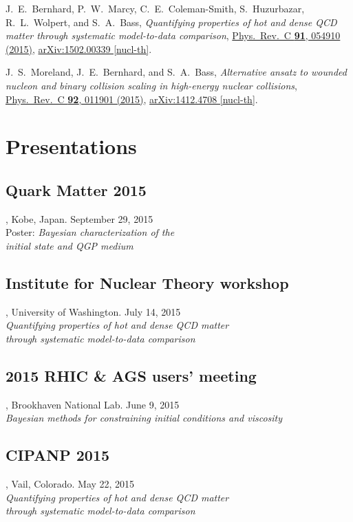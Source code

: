 \documentclass[letterpaper,10pt]{article}
\begin{document}
J.~E.~Bernhard, P.~W.~Marcy, C.~E.~Coleman-Smith, S.~Huzurbazar, R.~L.~Wolpert, and S.~A.~Bass,
\emph{Quantifying properties of hot and dense QCD matter through systematic model-to-data comparison},
\href{http://dx.doi.org/10.1103/PhysRevC.91.054910}{Phys.\ Rev.\ C {\bf 91}, 054910 (2015)},
\href{http://arxiv.org/abs/1502.00339}{arXiv:1502.00339 [nucl-th]}.

\vspace{1em}

J.~S.~Moreland, J.~E.~Bernhard, and S.~A.~Bass,
\emph{Alternative ansatz to wounded nucleon and binary collision scaling in high-energy nuclear collisions},
\href{http://dx.doi.org/10.1103/PhysRevC.92.011901}{Phys.\ Rev.\ C {\bf 92}, 011901 (2015)},
\href{http://arxiv.org/abs/1412.4708}{arXiv:1412.4708 [nucl-th]}.



\section{Presentations}


\subsection{Quark Matter 2015}, Kobe, Japan. \hfill September 29, 2015 \\
Poster: \emph{Bayesian characterization of the \\ initial state and QGP medium}

\subsection{Institute for Nuclear Theory workshop}, University of Washington. \hfill July 14, 2015 \\
\emph{Quantifying properties of hot and dense QCD matter \\ through systematic model-to-data comparison}

\subsection{2015 RHIC \& AGS users' meeting}, Brookhaven National Lab. \hfill June 9, 2015 \\
\emph{Bayesian methods for constraining initial conditions and viscosity}

\subsection{CIPANP 2015}, Vail, Colorado. \hfill May 22, 2015 \\
\emph{Quantifying properties of hot and dense QCD matter \\ through systematic model-to-data comparison}
\end{document}
